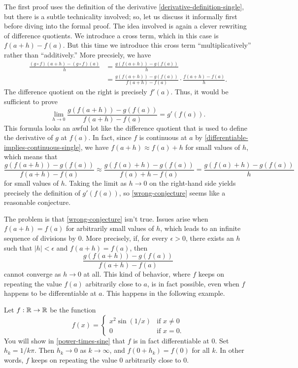 The first proof uses the definition of the derivative \ref{derivative-definition-single}, but there is a subtle technicality involved; so, let us discuss it informally first before diving into the formal proof. The idea involved is again a clever rewriting of difference quotients. We introduce a cross term, which in this case is $f(a+h) - f(a)$. But this time we introduce this cross term ``multiplicatively'' rather than ``additively.'' More precsiely, we have
\[ \begin{aligned} \frac{(g \circ f)(a+h) - (g \circ f)(a)}{h} &= \frac{g(f(a+h)) - g(f(a))}{h} \\ &= \frac{g(f(a+h)) - g(f(a))}{f(a+h)-f(a)} \cdot \frac{f(a+h)-f(a)}{h}. \end{aligned} \]
The difference quotient on the right is precisely $f'(a)$. Thus, it would be sufficient to prove  
\begin{equation} \label{wrong-conjecture} \lim_{h \to 0} \frac{g(f(a+h)) - g(f(a))}{f(a+h)-f(a)} = g'(f(a)). \end{equation}
This formula looks an awful lot like the difference quotient that is used to define the derivative of $g$ at $f(a)$. In fact, since $f$ is continuous at $a$ by \cref{differentiable-implies-continuous-single}, we have $f(a+h) \approx f(a)+h$ for small values of $h$, which means that
\[ \frac{g(f(a+h)) - g(f(a))}{f(a+h)-f(a)} \approx \frac{g(f(a)+h) - g(f(a))}{f(a)+h-f(a)} = \frac{g(f(a)+h) - g(f(a))}{h} \]
for small values of $h$. Taking the limit as $h \to 0$ on the right-hand side yields precisely the definition of $g'(f(a))$, so \cref{wrong-conjecture} seems like a reasonable conjecture. 

The problem is that \cref{wrong-conjecture} isn't true. Issues arise when $f(a+h) = f(a)$ for arbitrarily small values of $h$, which leads to an infinite sequence of divisions by 0. More precisely, if, for every $\epsilon > 0$, there exists an $h$ such that $|h| < \epsilon$ and $f(a+h)=f(a)$, then 
\[ \frac{g(f(a+h)) - g(f(a))}{f(a+h)-f(a)} \]
cannot converge as $h \to 0$ at all. This kind of behavior, where $f$ keeps on repeating the value $f(a)$ arbitrarily close to $a$, is in fact possible, even when $f$ happens to be differentiable at $a$. This happens in the following example. 

\begin{example} \label{wrong-conjecture-counterexample}
	Let $f : \mathbb{R} \to \mathbb{R}$ be the function \[ f(x) = \begin{cases} x^2\sin(1/x) & \text{if } x \neq 0 \\ 0 & \text{if } x = 0. \end{cases} \] You will show in \cref{power-times-sine} that $f$ is in fact differentiable at 0. Set $h_k = 1/k\pi$. Then $h_k \to 0$ as $k \to \infty$, and $f(0 + h_k) = f(0)$ for all $k$. In other words, $f$ keeps on repeating the value 0 arbitrarily close to 0. 
\end{example}

